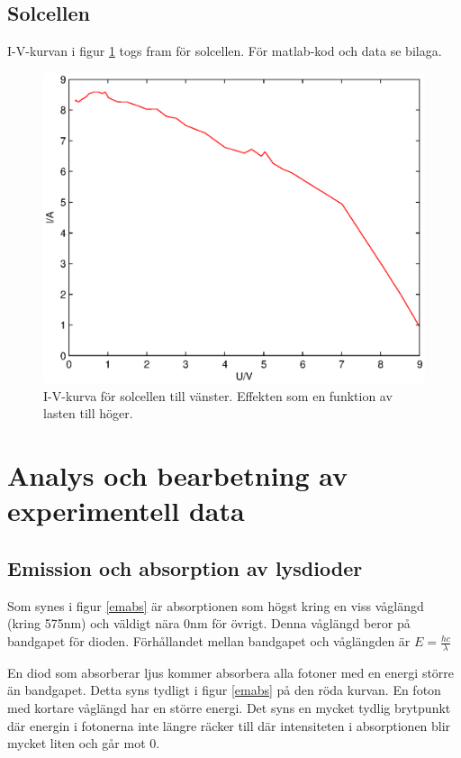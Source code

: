 \documentclass[a4paper]{article}
\begin{document}
\subsection{Solcellen}
I-V-kurvan i figur \ref{solcelliv} togs fram för solcellen. För matlab-kod och data se bilaga.
\begin{figure}[H]
	\centering
	\includegraphics[scale=.5]{solcell.eps}
	\caption{I-V-kurva för solcellen till vänster. Effekten som en funktion av lasten till höger.}
	\label{solcelliv}
\end{figure}

\section{Analys och bearbetning av experimentell data}
\subsection{Emission och absorption av lysdioder}
Som synes i figur \ref{emabs} är absorptionen som högst kring en viss våglängd (kring 575nm) och väldigt nära 0nm för övrigt. Denna våglängd beror på bandgapet för dioden. Förhållandet mellan bandgapet och våglängden är $E = \frac{hc}{\lambda}$

En diod som absorberar ljus kommer absorbera alla fotoner med en energi större än bandgapet. Detta syns tydligt i figur \ref{emabs} på den röda kurvan. En foton med kortare våglängd har en större energi. Det syns en mycket tydlig brytpunkt där energin i fotonerna inte längre räcker till där intensiteten i absorptionen blir mycket liten och går mot 0. 
\end{document}

